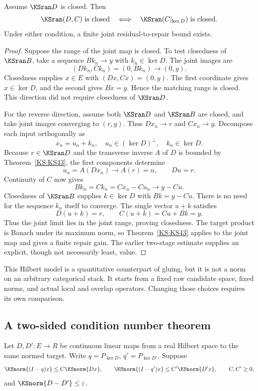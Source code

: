 \begin{KStheorem}\label{KS:KS47}
Assume \(\KSran D\) is closed. Then
\[
 \KSran(D,C)\text{ is closed}\quad\Longleftrightarrow\quad
 \KSran(C|_{\ker D})\text{ is closed}.
\]
Under either condition, a finite joint residual-to-repair bound exists.
\end{KStheorem}
\begin{proof}
Suppose the range of the joint map is closed. To test closedness of $\KSran B$, take a sequence $Bk_n\to y$ with $k_n\in\ker D$. The joint images are
\[
 (Dk_n,Ck_n)=(0,Bk_n)\longrightarrow(0,y).
\]
Closedness supplies $x\in E$ with $(Dx,Cx)=(0,y)$. The first coordinate gives $x\in\ker D$, and the second gives $Bx=y$. Hence the matching range is closed. This direction did not require closedness of $\KSran D$.

For the reverse direction, assume both $\KSran D$ and $\KSran B$ are closed, and take joint images converging to $(r,y)$. Thus $Dx_n\to r$ and $Cx_n\to y$. Decompose each input orthogonally as
\[
 x_n=u_n+k_n,\quad
 u_n\in(\ker D)^\perp,\quad k_n\in\ker D.
\]
Because $r\in\KSran D$ and the transverse inverse $A$ of $D$ is bounded by Theorem~\ref{KS:KS43}, the first components determine
\[
 u_n=A(Dx_n)\longrightarrow A(r)=u,
 \qquad Du=r.
\]
Continuity of $C$ now gives
\[
 Bk_n=Ck_n=Cx_n-Cu_n\longrightarrow y-Cu.
\]
Closedness of $\KSran B$ supplies $k\in\ker D$ with $Bk=y-Cu$. There is no need for the sequence $k_n$ itself to converge. The single vector $u+k$ satisfies
\[
 D(u+k)=r,
 \qquad C(u+k)=Cu+Bk=y.
\]
Thus the joint limit lies in the joint range, proving closedness. The target product is Banach under its maximum norm, so Theorem~\ref{KS:KS43} applies to the joint map and gives a finite repair gain. The earlier two-stage estimate supplies an explicit, though not necessarily least, value.
\end{proof}


This Hilbert model is a quantitative counterpart of gluing, but it is not a norm on an arbitrary categorical stack. It starts from a fixed raw candidate space, fixed norms, and actual local and overlap operators. Changing those choices requires its own comparison.

\label{KS:sec:motion}
\subsection{A two-sided condition number theorem}
Let \(D,D':E\to R\) be continuous linear maps from a real Hilbert space to the same normed target. Write \(q=P_{\ker D}\), \(q'=P_{\ker D'}\). Suppose
\[
 \KSnorm{(I-q)x}\le C\KSnorm{Dx},\qquad
 \KSnorm{(I-q')x}\le C'\KSnorm{D'x},\qquad C,C'\ge0,
\]
and \(\KSnorm{D-D'}\le\varepsilon\).

